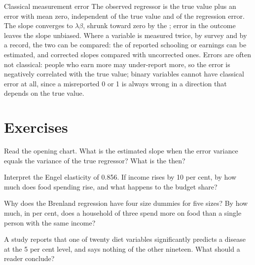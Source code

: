 \begin{model}{Classical measurement error}
\assumes The observed regressor is the true value plus an error with mean zero, independent of the true value and of the
regression error.
\predicts The slope converges to $\lambda\beta$, shrunk toward zero by the ; error in the outcome leaves
the slope unbiased.
\tested Where a variable is measured twice, by survey and by a record, the two can be compared: the 
of reported schooling or earnings can be estimated, and corrected slopes compared with uncorrected ones.
\breaks Errors are often not classical: people who earn more may under-report more, so the error is negatively
correlated with the true value; binary variables cannot have classical error at all, since a misreported 0 or 1 is
always wrong in a direction that depends on the true value.
\end{model}

\section{Exercises}\label{sec:b2:specification:exercises}

\begin{exercise}[$\star$]\label{exo:b2:specification:1}
Read the opening chart. What is the estimated slope when the error variance equals the variance of the true regressor?
What is the  then?
\end{exercise}

\begin{exercise}[$\star$]\label{exo:b2:specification:2}
Interpret the Engel elasticity of 0.856. If income rises by 10 per cent, by how much does food spending rise, and what
happens to the budget share?
\end{exercise}

\begin{exercise}[$\star$]\label{exo:b2:specification:3}
Why does the Brenland regression have four size dummies for five sizes? By how much, in per cent, does a household of
three spend more on food than a single person with the same income?
\end{exercise}

\begin{exercise}[$\star$]\label{exo:b2:specification:4}
A study reports that one of twenty diet variables significantly predicts a disease at the 5 per cent level, and says
nothing of the other nineteen. What should a reader conclude?
\end{exercise}


